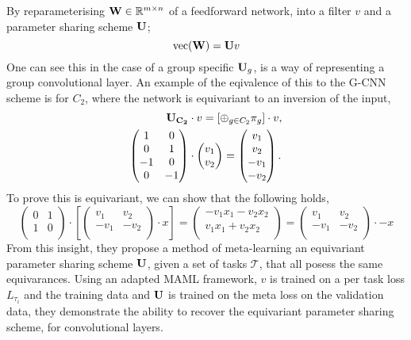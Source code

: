 By reparameterising $\mathbf{W} \in \mathbb{R}^{m \times n}$ of a feedforward network, into a filter $v$ and a parameter sharing scheme $\mathbf{U}$;
\begin{equation}
	\text{vec}(\mathbf{W}) = \mathbf{U}v
\end{equation}
One can see this in the case of a group specific $\mathbf{U}_g$, is a way of representing a group convolutional layer.
An example of the eqivalence of this to the G-CNN scheme is for $C_2$, where the network is equivariant to an inversion of the input,
\begin{align}
	\mathbf{U_{C_2}}   & \cdot v  = [\oplus_{g \in C_2} \pi_g] \cdot v, \\
	\begin{pmatrix}
		1  & 0  \\
		0  & 1  \\
		-1 & 0  \\
		0  & -1 \\
	\end{pmatrix} & \cdot
	\begin{pmatrix}
		v_1 \\
		v_2 \\
	\end{pmatrix}
	= \begin{pmatrix}
		  v_1  \\
		  v_2  \\
		  -v_1 \\
		  -v_2 \\
	  \end{pmatrix}.
\end{align}
To prove this is equivariant, we can show that the following holds, 
\begin{equation}
	\begin{pmatrix}
		0  & 1  \\
		1  & 0  \\
	\end{pmatrix} \cdot \left[
		\begin{pmatrix}
			v_1  & v_2  \\
			-v_1 & -v_2 \\
		\end{pmatrix} \cdot x \right] = \begin{pmatrix}
		                                -v_1 x_1 - v_2 x_2 \\
		                                v_1 x_1 + v_2 x_2  \\
	                                \end{pmatrix}
	= \begin{pmatrix}
		 v_1  & v_2  \\
		 -v_1 & -v_2 \\
	 \end{pmatrix} \cdot  -x
\end{equation}
From this insight, they propose a method of meta-learning an equivariant parameter sharing scheme $\mathbf{U}$, given a set of tasks $\mathcal{T}$, that all posess the same equivarances.
Using an adapted MAML framework, $v$ is trained on a per task loss $L_{\tau_i}$ and the training data and $\mathbf{U}$ is trained on the meta loss on the validation data, they demonstrate the ability to recover the equivariant parameter sharing scheme, for convolutional layers.